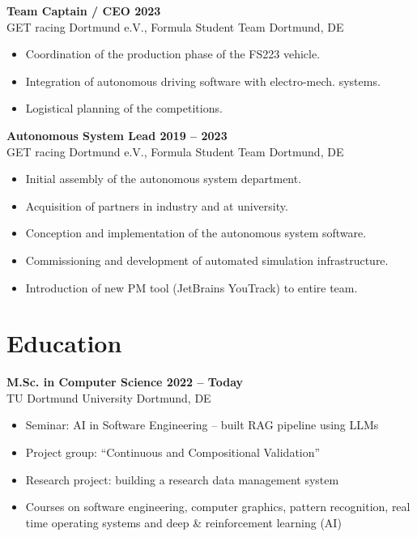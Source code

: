 \documentclass[a4paper,11pt]{article}
\newcommand{\subsectionskip}[0]{\vspace{0.125cm}}
\newcommand{\col}[2]{\textcolor[HTML]{#1}{#2}}
\begin{document}
\begin{minipage}[t]{0.65\textwidth}
    \subsectionskip

    \col{ab8064}{\textbf{Team Captain / CEO \hfill 2023}} \\
    GET racing Dortmund e.V., Formula Student Team \hfill Dortmund, DE
    \begin{itemize}
        \small
        \item Coordination of the production phase of the FS223 vehicle.
        \item Integration of autonomous driving software with electro-mech. systems.
        \item Logistical planning of the competitions.
    \end{itemize}

    \subsectionskip

    \col{9c7d6c}{\textbf{Autonomous System Lead \hfill 2019 -- 2023}} \\
    GET racing Dortmund e.V., Formula Student Team \hfill Dortmund, DE
    \begin{itemize}
        \small
        \item Initial assembly of the autonomous system department.
        \item Acquisition of partners in industry and at university.
        \item Conception and implementation of the autonomous system software.
        \item Commissioning and development of automated simulation infrastructure.
        \item Introduction of new PM tool (JetBrains YouTrack) to entire team.
    \end{itemize}

    \section*{\col{7e7576}{Education}}
    \col{7f7679}{\textbf{M.Sc. in Computer Science \hfill 2022 -- Today}} \\
    TU Dortmund University \hfill Dortmund, DE
    \begin{itemize}
        \small
        \item Seminar: AI in Software Engineering -- built RAG pipeline using LLMs
        \item Project group: \enquote{Continuous and Compositional Validation}
        \item Research project: building a research data management system
        \item Courses on software engineering, computer graphics, pattern recognition, real time operating systems and deep \& reinforcement learning (AI)
    \end{itemize}


\end{minipage}
\end{document}
